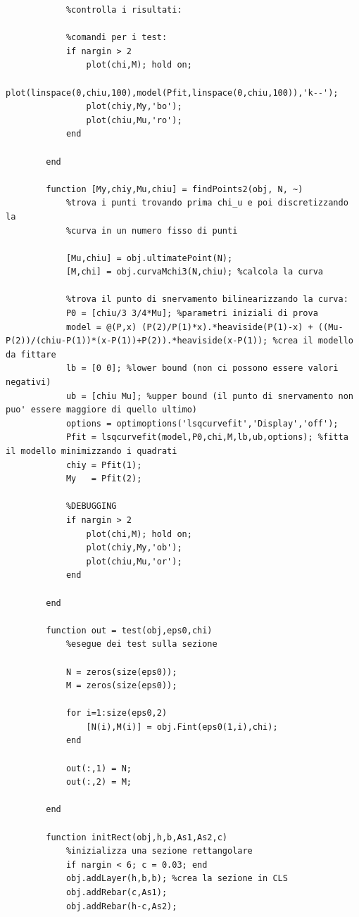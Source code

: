 \documentclass[10pt]{article}
\begin{document}
\begin{lstlisting}
            %controlla i risultati:
            
            %comandi per i test:
            if nargin > 2
                plot(chi,M); hold on;
                plot(linspace(0,chiu,100),model(Pfit,linspace(0,chiu,100)),'k--');
                plot(chiy,My,'bo');
                plot(chiu,Mu,'ro');
            end
            
        end
        
        function [My,chiy,Mu,chiu] = findPoints2(obj, N, ~)
            %trova i punti trovando prima chi_u e poi discretizzando la
            %curva in un numero fisso di punti
            
            [Mu,chiu] = obj.ultimatePoint(N);
            [M,chi] = obj.curvaMchi3(N,chiu); %calcola la curva
            
            %trova il punto di snervamento bilinearizzando la curva:
            P0 = [chiu/3 3/4*Mu]; %parametri iniziali di prova
            model = @(P,x) (P(2)/P(1)*x).*heaviside(P(1)-x) + ((Mu-P(2))/(chiu-P(1))*(x-P(1))+P(2)).*heaviside(x-P(1)); %crea il modello da fittare
            lb = [0 0]; %lower bound (non ci possono essere valori negativi)
            ub = [chiu Mu]; %upper bound (il punto di snervamento non puo' essere maggiore di quello ultimo)
            options = optimoptions('lsqcurvefit','Display','off');
            Pfit = lsqcurvefit(model,P0,chi,M,lb,ub,options); %fitta il modello minimizzando i quadrati
            chiy = Pfit(1);
            My   = Pfit(2);
            
            %DEBUGGING
            if nargin > 2
                plot(chi,M); hold on;
                plot(chiy,My,'ob');
                plot(chiu,Mu,'or');
            end
            
        end
        
        function out = test(obj,eps0,chi)
            %esegue dei test sulla sezione
            
            N = zeros(size(eps0));
            M = zeros(size(eps0));
            
            for i=1:size(eps0,2)
                [N(i),M(i)] = obj.Fint(eps0(1,i),chi);
            end
            
            out(:,1) = N;
            out(:,2) = M;
            
        end
        
        function initRect(obj,h,b,As1,As2,c)
            %inizializza una sezione rettangolare
            if nargin < 6; c = 0.03; end
            obj.addLayer(h,b,b); %crea la sezione in CLS
            obj.addRebar(c,As1);
            obj.addRebar(h-c,As2);
            

\end{lstlisting}
\end{document}
